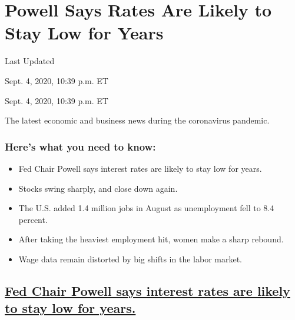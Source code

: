 \hypertarget{powell-says-rates-are-likely-to-stay-low-for-years}{%
\section{Powell Says Rates Are Likely to Stay Low for
Years}\label{powell-says-rates-are-likely-to-stay-low-for-years}}

Last Updated

Sept. 4, 2020, 10:39 p.m. ET

Sept. 4, 2020, 10:39 p.m. ET

The latest economic and business news during the coronavirus pandemic.

\hypertarget{heres-what-you-need-to-know}{%
\subsubsection{Here's what you need to
know:}\label{heres-what-you-need-to-know}}

\begin{itemize}
\item
  \protect\hyperlink{fed-chair-powell-says-interest-rates-are-likely-to-stay-low-for-years}{}

  Fed Chair Powell says interest rates are likely to stay low for years.
\item
  \protect\hyperlink{stocks-swing-sharply-and-close-down-again}{}

  Stocks swing sharply, and close down again.
\item
  \protect\hyperlink{jobs-report-august-2020}{}

  The U.S. added 1.4 million jobs in August as unemployment fell to 8.4
  percent.
\item
  \protect\hyperlink{after-taking-the-heaviest-employment-hit-women-make-a-sharp-rebound}{}

  After taking the heaviest employment hit, women make a sharp rebound.
\item
  \protect\hyperlink{wage-data-remain-distorted-by-big-shifts-in-the-labor-market}{}

  Wage data remain distorted by big shifts in the labor market.
\end{itemize}

\hypertarget{fed-chair-powell-says-interest-rates-are-likely-to-stay-low-for-years}{%
\subsection{\texorpdfstring{\protect\hyperlink{fed-chair-powell-says-interest-rates-are-likely-to-stay-low-for-years}{Fed
Chair Powell says interest rates are likely to stay low for
years.}}{Fed Chair Powell says interest rates are likely to stay low for years.}}\label{fed-chair-powell-says-interest-rates-are-likely-to-stay-low-for-years}}

